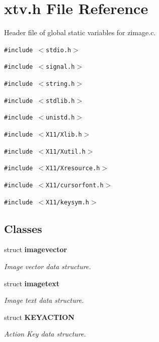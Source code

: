 \section{xtv.h File Reference}
\label{xtv_8h}
Header file of global static variables for zimage.c. 

{\tt \#include $<$stdio.h$>$}\par
{\tt \#include $<$signal.h$>$}\par
{\tt \#include $<$string.h$>$}\par
{\tt \#include $<$stdlib.h$>$}\par
{\tt \#include $<$unistd.h$>$}\par
{\tt \#include $<$X11/Xlib.h$>$}\par
{\tt \#include $<$X11/Xutil.h$>$}\par
{\tt \#include $<$X11/Xresource.h$>$}\par
{\tt \#include $<$X11/cursorfont.h$>$}\par
{\tt \#include $<$X11/keysym.h$>$}\par
\subsection*{Classes}
\begin{CompactItemize}
\item 
struct {\bf imagevector}
\begin{CompactList}\small\item\em Image vector data structure. \item\end{CompactList}\item 
struct {\bf imagetext}
\begin{CompactList}\small\item\em Image text data structure. \item\end{CompactList}\item 
struct {\bf KEYACTION}
\begin{CompactList}\small\item\em Action Key data structure. \item\end{CompactList}\end{CompactItemize}

